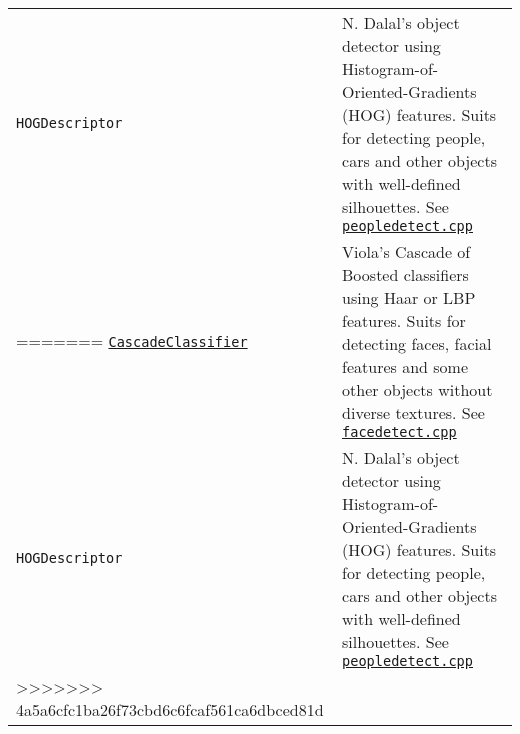 \documentclass[10pt,landscape]{article}
\begin{document}
\begin{multicols}{3}
\begin{tabular}{@{}p{\the\MyLen}%
                @{}p{\linewidth-\the\MyLen}@{}}
\texttt{{HOGDescriptor}} & N. Dalal's object detector using Histogram-of-Oriented-Gradients (HOG) features. Suits for detecting people, cars and other objects with well-defined silhouettes. See \texttt{\href{https://github.com/Itseez/opencv/tree/master/samples/cpp/peopledetect.cpp}{peopledetect.cpp}}\\
=======
\texttt{\href{http://docs.opencv.org/modules/objdetect/doc/cascade_classification.html\#cascadeclassifier}{CascadeClassifier}} & Viola's Cascade of Boosted classifiers using Haar or LBP features. Suits for detecting faces, facial features and some other objects without diverse textures. See \texttt{\href{https://github.com/opencv/opencv/tree/master/samples/c/facedetect.cpp}{facedetect.cpp}}\\

\texttt{{HOGDescriptor}} & N. Dalal's object detector using Histogram-of-Oriented-Gradients (HOG) features. Suits for detecting people, cars and other objects with well-defined silhouettes. See \texttt{\href{https://github.com/opencv/opencv/tree/master/samples/cpp/peopledetect.cpp}{peopledetect.cpp}}\\
>>>>>>> 4a5a6cfc1ba26f73cbd6c6fcaf561ca6dbced81d

\end{tabular}

%
%
%

\end{multicols}
\end{document}
